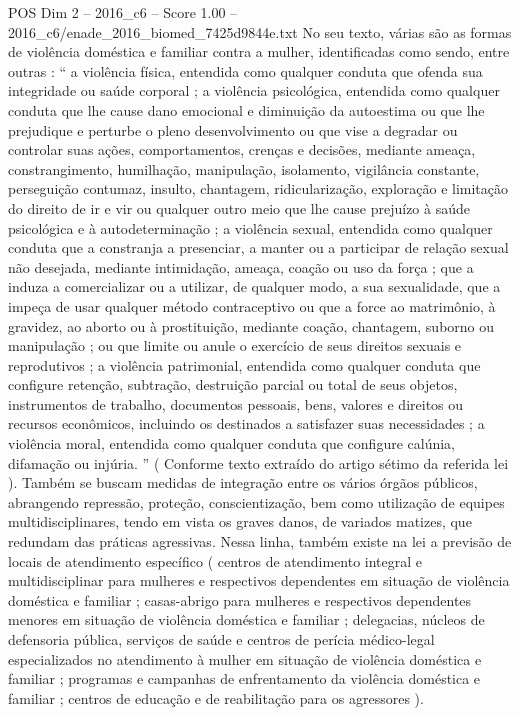 \begin{textsample}{POS Dim 2 – 2016\_c6 – Score 1.00 – 2016\_c6/enade\_2016\_biomed\_7425d9844e.txt}
No seu texto, várias são as formas de violência doméstica e familiar contra a mulher, identificadas como sendo, entre outras : “ a violência física, entendida como qualquer conduta que ofenda sua integridade ou saúde corporal ; a violência psicológica, entendida como qualquer conduta que lhe cause dano emocional e diminuição da autoestima ou que lhe prejudique e perturbe o pleno desenvolvimento ou que vise a degradar ou controlar suas ações, comportamentos, crenças e decisões, mediante ameaça, constrangimento, humilhação, manipulação, isolamento, vigilância constante, perseguição contumaz, insulto, chantagem, ridicularização, exploração e limitação do direito de ir e vir ou qualquer outro meio que lhe cause prejuízo à saúde psicológica e à autodeterminação ; a violência sexual, entendida como qualquer conduta que a constranja a presenciar, a manter ou a participar de relação sexual não desejada, mediante intimidação, ameaça, coação ou uso da força ; que a induza a comercializar ou a utilizar, de qualquer modo, a sua sexualidade, que a impeça de usar qualquer método contraceptivo ou que a force ao matrimônio, à gravidez, ao aborto ou à prostituição, mediante coação, chantagem, suborno ou manipulação ; ou que limite ou anule o exercício de seus direitos sexuais e reprodutivos ; a violência patrimonial, entendida como qualquer conduta que configure retenção, subtração, destruição parcial ou total de seus objetos, instrumentos de trabalho, documentos pessoais, bens, valores e direitos ou recursos econômicos, incluindo os destinados a satisfazer suas necessidades ; a violência moral, entendida como qualquer conduta que configure calúnia, difamação ou injúria. ” ( Conforme texto extraído do artigo sétimo da referida lei ).
Também se buscam medidas de integração entre os vários órgãos públicos, abrangendo repressão, proteção, conscientização, bem como utilização de equipes multidisciplinares, tendo em vista os graves danos, de variados matizes, que redundam das práticas agressivas.
Nessa linha, também existe na lei a previsão de locais de atendimento específico ( centros de atendimento integral e multidisciplinar para mulheres e respectivos dependentes em situação de violência doméstica e familiar ; casas-abrigo para mulheres e respectivos dependentes menores em situação de violência doméstica e familiar ; delegacias, núcleos de defensoria pública, serviços de saúde e centros de perícia médico-legal especializados no atendimento à mulher em situação de violência doméstica e familiar ; programas e campanhas de enfrentamento da violência doméstica e familiar ; centros de educação e de reabilitação para os agressores ).

\end{textsample}
